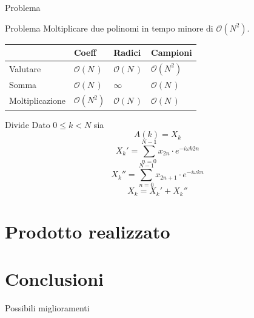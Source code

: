 \documentclass[10pt, xetex, handout]{beamer}
\begin{document}
\begin{frame}{Problema}
    \begin{block}{Problema}
        Moltiplicare due polinomi in tempo minore di \(\mathcal{O}(N^2)\).
    \end{block}
    \begin{table}
        \begin{tabular}{l | l l l}
                            & Coeff             & Radici             & Campioni \\
                            \midrule
            Valutare        & \(\mathcal{O}(N\,)\)   & \(\mathcal{O}(N\,)\) & \(\mathcal{O}(N^2)\) \\
            Somma           & \(\mathcal{O}(N\,)\)   & \(\infty        \) & \(\mathcal{O}(N\,)\) \\
            Moltiplicazione & \(\mathcal{O}(N^2)\) & \(\mathcal{O}(N\,)\) & \(\mathcal{O}(N\,)\) \\
        \end{tabular}
    \end{table}
\end{frame}

\begin{frame}{Divide}
    Dato \(0 \leq k < N\) sia \[A(k) = X_k\]
    \[
        X_k' = \sum_{n=0}^{N-1} x_{2n}\cdot e^{-i\omega k2n}
    \]
    \[
        X_k'' = \sum_{n=0}^{N-1} x_{2n+1}\cdot e^{-i\omega kn}
    \]
    \[
        X_k = X_k' + X_k''
    \]

\end{frame}

\section{Prodotto realizzato}
\begin{frame}{}
\end{frame}

\section{Conclusioni}
\begin{frame}{Possibili miglioramenti}
\end{frame}
\end{document}
